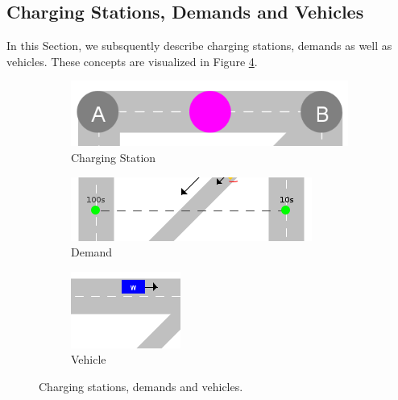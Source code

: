 \documentclass[graybox]{svmult}
\begin{document}
\noindent
\subsection{Charging Stations, Demands and Vehicles}
\label{sec:chargingstations-demands-vehicles}	
In this Section, we subsquently describe charging stations, demands as well as vehicles. These concepts are visualized in Figure \ref{fig:chargingstations-demands-vehicles}.
\vspace{4mm}

\begin{figure}
	\hfill
	\begin{subfigure}{.3\textwidth}
		\centering
		\includegraphics[scale=0.25]{../../concepts/charge-station.png}
		\caption{Charging Station}
		\label{fig:charging-station}	
	\end{subfigure}
	\hfill
	\begin{subfigure}{.3\textwidth}
		\centering
		\includegraphics[scale=0.4]{../../concepts/demand.png}
		\caption{Demand}
		\label{fig:demand}
	\end{subfigure}
	\hfill
	\begin{subfigure}{.3\textwidth}
		\centering
		\includegraphics[scale=0.6]{../../concepts/vehicle.png}
		\caption{Vehicle}
		\label{fig:vehicle}	
	\end{subfigure}

	\caption{Charging stations, demands and vehicles.}
	\label{fig:chargingstations-demands-vehicles}	
\end{figure}
\end{document}
